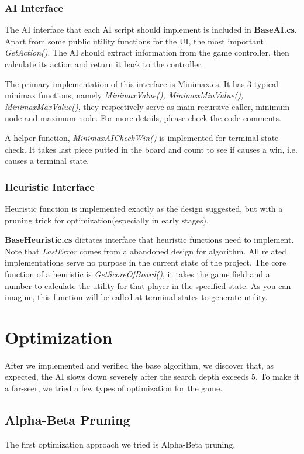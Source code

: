 \documentclass[12pt,a4paper]{article}
\begin{document}
	\subsubsection{AI Interface}
	The AI interface that each AI script should implement is included in \textbf{BaseAI.cs}. Apart from some public utility functions for the UI, the most important \textit{GetAction()}. The AI should extract information from the game controller, then calculate its action and return it back to the controller.
	
	The primary implementation of this interface is Minimax.cs. It has 3 typical minimax functions, namely \textit{MinimaxValue(), MinimaxMinValue(), MinimaxMaxValue()}, they respectively serve as main recursive caller, minimum node and maximum node. For more details, please check the code comments.
	
	A helper function, \textit{MinimaxAICheckWin()} is implemented for terminal state check. It takes last piece putted in the board and count to see if causes a win, i.e. causes a terminal state.
	\subsubsection{Heuristic Interface}
	Heuristic function is implemented exactly as the design suggested, but with a pruning trick for optimization(especially in early stages).
	
	\textbf{BaseHeuristic.cs} dictates interface that heuristic functions need to implement. Note that \textit{LastError} comes from a abandoned design for algorithm. All related implementations serve no purpose in the current state of the project. The core function of a heuristic is \textit{GetScoreOfBoard()}, it takes the game field and a number to calculate the utility for that player in the specified state. As you can imagine, this function will be called at terminal states to generate utility.
	
	\section{Optimization}
	After we implemented and verified the base algorithm, we discover that, as expected, the AI slows down severely after the search depth exceeds 5. To make it a far-seer, we tried a few types of optimization for the game.
	\subsection{Alpha-Beta Pruning}
	The first optimization approach we tried is Alpha-Beta pruning.\\
	
\end{document}
